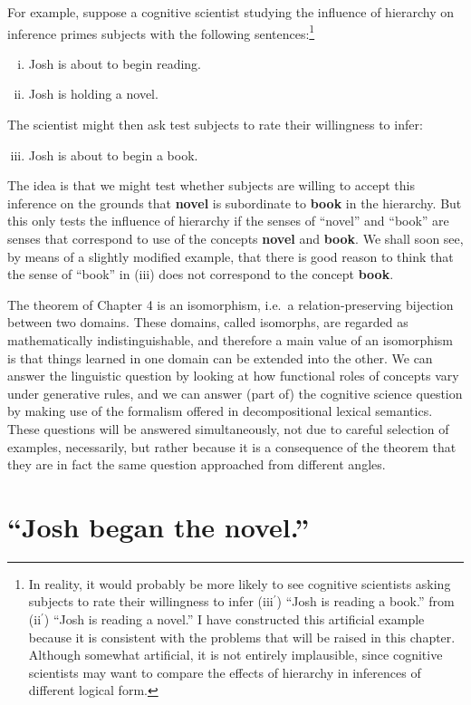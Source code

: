 For example, suppose a cognitive scientist studying the influence of hierarchy on inference primes subjects with the following sentences:\footnote{In reality, it would probably be more likely to see cognitive scientists asking subjects to rate their willingness to infer (iii$^\prime$) ``Josh is reading a book.'' from (ii$^\prime$) ``Josh is reading a novel.'' I have constructed this artificial example because it is consistent with the problems that will be raised in this chapter. Although somewhat artificial, it is not entirely implausible, since cognitive scientists may want to compare the effects of hierarchy in inferences of different logical form.}
\begin{enumerate}[(i)]
\item Josh is about to begin reading.
\item Josh is holding a novel.
\end{enumerate}
The scientist might then ask test subjects to rate their willingness to infer:
\begin{enumerate}[(i)]
\setcounter{enumi}{2}
\item Josh is about to begin a book.
\end{enumerate}
The idea is that we might test whether subjects are willing to accept this inference on the grounds that {\bf novel} is subordinate to {\bf book} in the hierarchy. But this only tests the influence of hierarchy if the senses of ``novel'' and ``book'' are senses that correspond to use of the concepts {\bf novel} and {\bf book}. We shall soon see, by means of a slightly modified example, that there is good reason to think that the sense of ``book'' in (iii) does not correspond to the concept {\bf book}.

The theorem of Chapter 4 is an isomorphism, i.e.\ a relation-preserving bijection between two domains. These domains, called isomorphs, are regarded as mathematically indistinguishable, and therefore a main value of an isomorphism is that things learned in one domain can be extended into the other. We can answer the linguistic question by looking at how functional roles of concepts vary under generative rules, and we can answer (part of) the cognitive science question by making use of the formalism offered in decompositional lexical semantics. These questions will be answered simultaneously, not due to careful selection of examples, necessarily, but rather because it is a consequence of the theorem that they are in fact the same question approached from different angles.

\section{``Josh began the novel.''}

